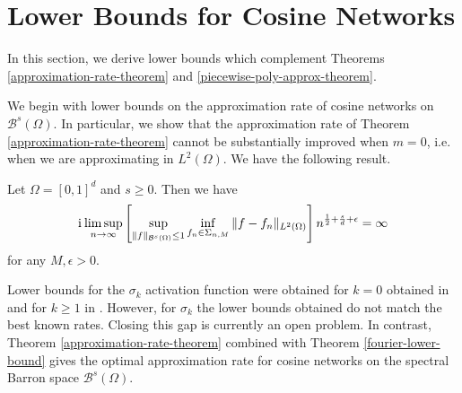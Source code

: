 \section{Lower Bounds for Cosine Networks}\label{lower-bounds-section}
In this section, we derive lower bounds which complement Theorems \ref{approximation-rate-theorem} and \ref{piecewise-poly-approx-theorem}.

We begin with lower bounds on the approximation rate of cosine networks on $\mathcal{B}^s(\Omega)$. In particular, we show that the approximation rate of Theorem \ref{approximation-rate-theorem} cannot be substantially improved when $m = 0$, i.e. when we are approximating in $L^2(\Omega)$. We have the following result.
\begin{theorem}\label{fourier-lower-bound}
 Let $\Omega = [0,1]^d$ and $s\geq 0$. Then we have
 \begin{equation}{\mathrm{i}\mkern1mu}
  \limsup_{n\rightarrow \infty} \left[\sup_{\|f\|_{\mathcal{B}^s(\Omega)} \leq 1}\inf_{f_n\in\Sigma_{n,M}} \|f - f_n\|_{L^2(\Omega)}\right]n^{\frac{1}{2} + \frac{s}{d} + \epsilon} = \infty
 \end{equation}
 for any $M,\epsilon > 0$.
\end{theorem}

Lower bounds for the $\sigma_k$ activation function were obtained for $k=0$ obtained in \cite{makovoz1996random} and for $k\geq 1$ in \cite{klusowski2018approximation}. However, for $\sigma_k$ the lower bounds obtained do not match the best known rates. Closing this gap is currently an open problem. In contrast, Theorem \ref{approximation-rate-theorem} combined with Theorem \ref{fourier-lower-bound} gives the optimal approximation rate for cosine networks on the spectral Barron space $\mathcal{B}^s(\Omega)$.

